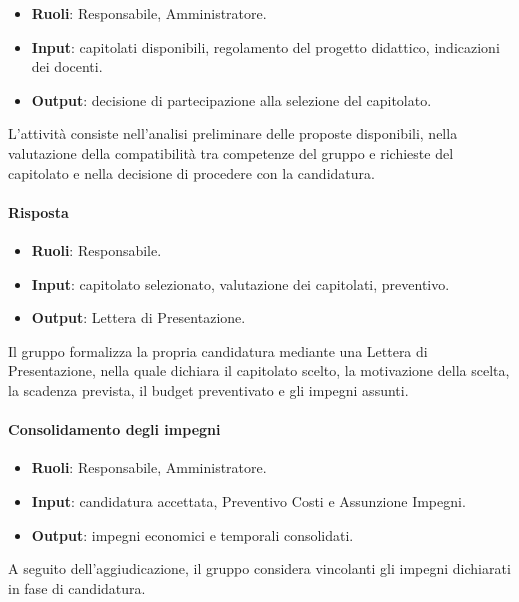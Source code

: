 \begin{itemize}
    \item \textbf{Ruoli}: Responsabile, Amministratore.
    \item \textbf{Input}: capitolati disponibili, regolamento del progetto didattico,
    indicazioni dei docenti.
    \item \textbf{Output}: decisione di partecipazione alla selezione del capitolato.
\end{itemize}

L'attività consiste nell'analisi preliminare delle proposte disponibili, nella
valutazione della compatibilità tra competenze del gruppo e richieste del capitolato
e nella decisione di procedere con la candidatura.

\paragraph{Risposta}

\begin{itemize}
    \item \textbf{Ruoli}: Responsabile.
    \item \textbf{Input}: capitolato selezionato, valutazione dei capitolati, preventivo.
    \item \textbf{Output}: Lettera di Presentazione.
\end{itemize}

Il gruppo formalizza la propria candidatura mediante una Lettera di Presentazione,
nella quale dichiara il capitolato scelto, la motivazione della scelta, la scadenza
prevista, il budget preventivato e gli impegni assunti.

\paragraph{Consolidamento degli impegni}

\begin{itemize}
    \item \textbf{Ruoli}: Responsabile, Amministratore.
    \item \textbf{Input}: candidatura accettata, Preventivo Costi e Assunzione Impegni.
    \item \textbf{Output}: impegni economici e temporali consolidati.
\end{itemize}

A seguito dell'aggiudicazione, il gruppo considera vincolanti gli impegni dichiarati
in fase di candidatura.


